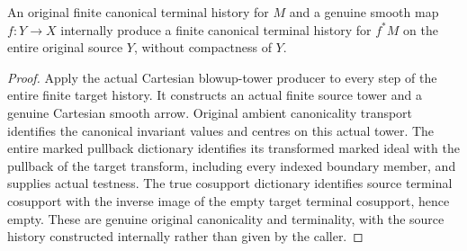 \begin{theorem}
\label{hir:original-global-finite-smooth-source-history}
\leanok
{}
An original finite canonical terminal history for $M$ and a genuine smooth
map $f:Y\to X$ internally produce a finite canonical terminal history for
$f^*M$ on the entire original source $Y$, without compactness of $Y$.
\end{theorem}
\begin{proof}
Apply the actual Cartesian blowup-tower producer to every step of the
entire finite target history. It constructs an actual finite source tower
and a genuine Cartesian smooth arrow. Original ambient canonicality
transport identifies the canonical invariant values and centres on this
actual tower. The entire marked pullback dictionary identifies its
transformed marked ideal with the pullback of the target transform,
including every indexed boundary member, and supplies actual testness.
The true cosupport dictionary identifies source terminal cosupport with
the inverse image of the empty target terminal cosupport, hence empty.
These are genuine original canonicality and terminality, with the source
history constructed internally rather than given by the caller.
\end{proof}

